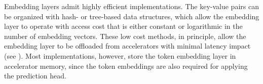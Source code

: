 Embedding layers admit highly efficient implementations. The key-value pairs can be organized with hash- or tree-based data structures, which allow the embedding layer to operate with access cost that is either constant or logarithmic in the number of embedding vectors.
These low cost methods, in principle, allow the embedding layer to be offloaded from accelerators with minimal latency impact (see ). Most implementations, however, store the token embedding layer in accelerator memory, since the token embeddings are also required for applying the prediction head.